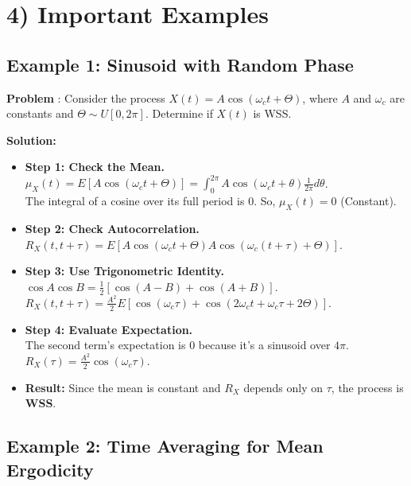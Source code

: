 \documentclass[11pt]{article}
\begin{document}
\section*{4) Important Examples}

\subsection*{Example 1: Sinusoid with Random Phase} 
\vspace{0.1 cm}
\textbf{Problem} : Consider the process $X(t) = A \cos(\omega_c t + \Theta)$, where $A$ and $\omega_c$ are constants and $\Theta \sim U[0, 2\pi]$. Determine if $X(t)$ is WSS.

\vspace{0.2cm}
\noindent \textbf{Solution:} 
\begin{itemize}
    \item \textbf{Step 1: Check the Mean.} \\
    $\mu_X(t) = E[A \cos(\omega_c t + \Theta)] = \int_{0}^{2\pi} A \cos(\omega_c t + \theta) \frac{1}{2\pi} d\theta$. \\
    The integral of a cosine over its full period is 0. So, $\mu_X(t) = 0$ (Constant).
    \item \textbf{Step 2: Check Autocorrelation.} \\
    $R_X(t, t+\tau) = E[A \cos(\omega_c t + \Theta) A \cos(\omega_c (t+\tau) + \Theta)]$.
    \item \textbf{Step 3: Use Trigonometric Identity.} \\
    $\cos A \cos B = \frac{1}{2}[\cos(A-B) + \cos(A+B)]$. \\
    $R_X(t, t+\tau) = \frac{A^2}{2} E[\cos(\omega_c \tau) + \cos(2\omega_c t + \omega_c \tau + 2\Theta)]$.
    \item \textbf{Step 4: Evaluate Expectation.} \\
    The second term's expectation is 0 because it's a sinusoid over $4\pi$. \\
    $R_X(\tau) = \frac{A^2}{2} \cos(\omega_c \tau)$.
    \item \textbf{Result:} Since the mean is constant and $R_X$ depends only on $\tau$, the process is \textbf{WSS}.
\end{itemize}

\vspace{0.4cm}

\subsection*{Example 2: Time Averaging for Mean Ergodicity} 
\end{document}
